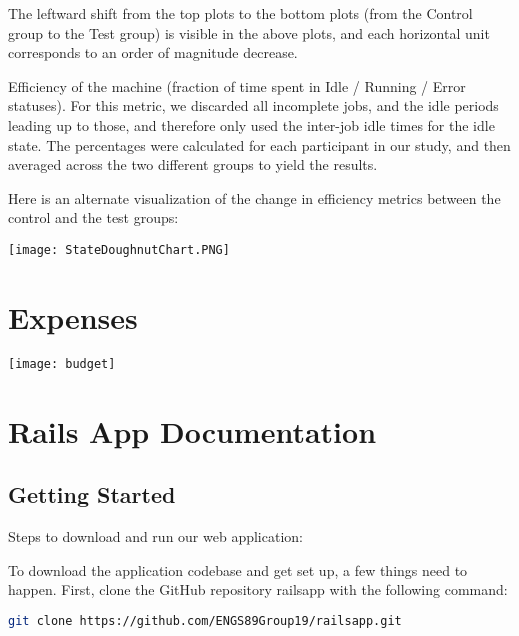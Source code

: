 \documentclass[12pt,letterpaper,titlepage]{article}
\begin{document}
The leftward shift from the top plots to the bottom plots (from the Control group to the Test group) is visible in the above plots, and each horizontal unit corresponds to an order of magnitude decrease.

Efficiency of the machine (fraction of time spent in Idle / Running / Error statuses).
For this metric, we discarded all incomplete jobs, and the idle periods leading up to those, and therefore only used the inter-job idle times for the idle state. The percentages were calculated for each participant in our study, and then averaged across the two different groups to yield the results.

Here is an alternate visualization of the change in efficiency metrics between the control and the test groups:

\begin{center}
	\texttt{[image: StateDoughnutChart.PNG]}	
\end{center}


\newpage
\section{Expenses} \label{sec:Expenses}
\begin{center}
\texttt{[image: budget]}
\end{center}


\newpage
{} \label{sec:AppendixB}

\section{Rails App Documentation} \label{sec:RailsAppDocumentation}

\subsection{Getting Started} \label{doc:GettingStarted}

Steps to download and run our web application:

To download the application codebase and get set up, a few things need to happen. First, clone the GitHub repository railsapp with the following command:

\begin{lstlisting}[language=bash]
git clone https://github.com/ENGS89Group19/railsapp.git
\end{lstlisting}
\end{document}
